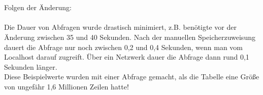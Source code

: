 \\\\
Folgen der Änderung:
\\\\
Die Dauer von Abfragen wurde drastisch minimiert, z.B.  benötigte vor der Änderung zwischen 35 und 40 Sekunden. Nach der manuellen Speicherzuweisung dauert die Abfrage nur noch zwischen 0,2 und 0,4 Sekunden, wenn man vom Localhost darauf zugreift. Über ein Netzwerk dauer die Abfrage dann rund 0,1 Sekunden länger.
\\
Diese Beispielwerte wurden mit einer Abfrage gemacht, als die Tabelle eine Größe von ungefähr 1,6 Millionen Zeilen hatte!
